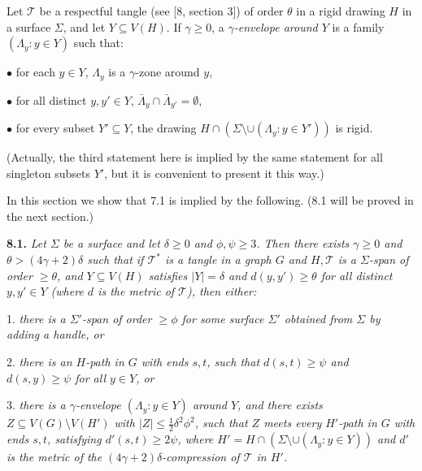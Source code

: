 
Let $\mathcal{T}$ be a respectful tangle (see [8, section 3]) of order $\theta$ in a rigid drawing $H$ in a surface $\Sigma$, and let $Y \subseteq V(H)$. If $\gamma \ge 0$, a \textit{$\gamma$-envelope around $Y$} is a family $(\Lambda_y\colon y \in Y)$ such that:

\hspace*{12pt}$\bullet$ for each $y \in Y$, $\Lambda_y$ is a $\gamma$-zone around $y$,

\hspace*{12pt}$\bullet$ for all distinct $y, y' \in Y$, $\bar{\Lambda}_y \cap \bar{\Lambda}_{y'} = \emptyset$,

\hspace*{12pt}$\bullet$ for every subset $Y' \subseteq Y$, the drawing $H \cap (\Sigma \setminus \cup (\Lambda_y\colon y \in Y'))$ is rigid.

(Actually, the third statement here is implied by the same statement for all singleton subsets $Y'$, but it is convenient to present it this way.)

In this section we show that 7.1 is implied by the following. (8.1 will be proved in the next section.)

\textbf{8.1.} \textit{Let $\Sigma$ be a surface and let $\delta \ge 0$ and $\phi, \psi \ge 3$. Then there exists $\gamma \ge 0$ and $\theta > (4\gamma + 2)\delta$ such that if $\mathcal{T}^*$ is a tangle in a graph $G$ and $H, \mathcal{T}$ is a $\Sigma$-span of order $\ge \theta$, and $Y \subseteq V(H)$ satisfies $|Y| = \delta$ and $d(y, y') \ge \theta$ for all distinct $y, y' \in Y$ (where $d$ is the metric of $\mathcal{T}$), then either:}

\hspace*{12pt}1. \textit{there is a $\Sigma'$-span of order $\ge \phi$ for some surface $\Sigma'$ obtained from $\Sigma$ by adding a handle, or}

\hspace*{12pt}2. \textit{there is an $H$-path in $G$ with ends $s, t$, such that $d(s, t) \ge \psi$ and $d(s, y) \ge \psi$ for all $y \in Y$, or}

\hspace*{12pt}3. \textit{there is a $\gamma$-envelope $(\Lambda_y\colon y \in Y)$ around $Y$, and there exists $Z \subseteq V(G) \setminus V(H')$ with $|Z| \le \frac{1}{2}\delta^2\phi^2$, such that $Z$ meets every $H'$-path in $G$ with ends $s, t$, satisfying $d'(s, t) \ge 2\psi$, where $H' = H \cap (\Sigma \setminus \cup (\Lambda_y\colon y \in Y))$ and $d'$ is the metric of the $(4\gamma + 2)\delta$-compression of $\mathcal{T}$ in $H'$.}

